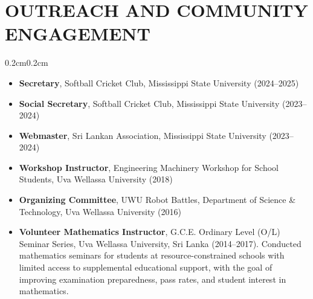 \documentclass[10pt, letterpaper]{article}
\newenvironment{highlights}{%
    \begin{itemize}[topsep=0.08cm, parsep=0.08cm, partopsep=0pt,
                    itemsep=0pt, leftmargin=0.4cm + 10pt]
}{\end{itemize}}
\newenvironment{onecolentry}{%
    \begin{adjustwidth}{0.2cm}{0.2cm}
}{\end{adjustwidth}}
\begin{document}
\section{OUTREACH AND COMMUNITY ENGAGEMENT}
\vspace{0.08cm}
\begin{onecolentry}
    \begin{highlights}
        \item \textbf{Secretary}, Softball Cricket Club, Mississippi State University
              (2024--2025)
        \item \textbf{Social Secretary}, Softball Cricket Club, Mississippi State
              University (2023--2024)
        \item \textbf{Webmaster}, Sri Lankan Association, Mississippi State University
              (2023--2024)
        \item \textbf{Workshop Instructor}, Engineering Machinery Workshop for School
              Students, Uva Wellassa University (2018)
        \item \textbf{Organizing Committee}, UWU Robot Battles, Department of Science
              \& Technology, Uva Wellassa University (2016)
        \item \textbf{Volunteer Mathematics Instructor}, G.C.E. Ordinary Level (O/L)
              Seminar Series, Uva Wellassa University, Sri Lanka (2014--2017).
              Conducted mathematics seminars for students at resource-constrained
              schools with limited access to supplemental educational support, with
              the goal of improving examination preparedness, pass rates, and student
              interest in mathematics.
    \end{highlights}
\end{onecolentry}
\vspace{0.18cm}

\end{document}
